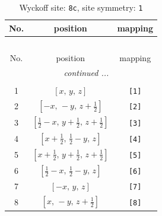 \documentclass[fleqn,8pt]{jsarticle}
\begin{document}
\renewcommand{\arraystretch}{1.2}
\begin{longtable}{ccc}
\caption{Wyckoff site: {\tt 8c}, site symmetry: {\tt 1}}
 \\
 \hline \hline
No. & position & mapping \\ \hline \endfirsthead

\multicolumn{2}{l}{\tablename\ \thetable{}} \\
 \hline \hline
No. & position & mapping \\ \hline \endhead

 \hline \hline
\multicolumn{2}{r}{\footnotesize\it continued ...} \\ \endfoot

 \hline \hline
\multicolumn{2}{r}{} \\ \endlastfoot

1 & $\left[ x,\, y,\, z \right]$ & {\tt [1]} \\ \hline
2 & $\left[ - x,\, - y,\, z + \frac{1}{2} \right]$ & {\tt [2]} \\ \hline
3 & $\left[ \frac{1}{2} - x,\, y + \frac{1}{2},\, z + \frac{1}{2} \right]$ & {\tt [3]} \\ \hline
4 & $\left[ x + \frac{1}{2},\, \frac{1}{2} - y,\, z \right]$ & {\tt [4]} \\ \hline
5 & $\left[ x + \frac{1}{2},\, y + \frac{1}{2},\, z + \frac{1}{2} \right]$ & {\tt [5]} \\ \hline
6 & $\left[ \frac{1}{2} - x,\, \frac{1}{2} - y,\, z \right]$ & {\tt [6]} \\ \hline
7 & $\left[ - x,\, y,\, z \right]$ & {\tt [7]} \\ \hline
8 & $\left[ x,\, - y,\, z + \frac{1}{2} \right]$ & {\tt [8]} \\
\end{longtable}
\end{document}
